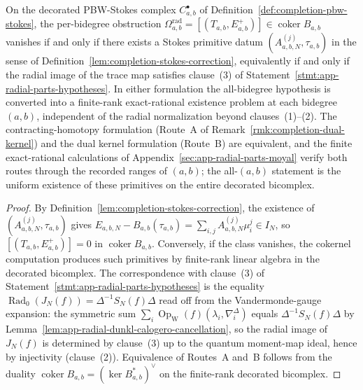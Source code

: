 \begin{thm}
\label{thm:completion-omega-rad-vanishes}
On the decorated PBW-Stokes complex
\(C^\bullet_{a,b}\) of Definition~\ref{def:completion-pbw-stokes},
the per-bidegree obstruction
\(\Omega^{\mathrm{rad}}_{a,b}=[(T_{a,b},E^+_{a,b})]\in
\operatorname{coker}B_{a,b}\) vanishes if and only if there exists a
Stokes primitive datum
\((A^{(j)}_{a,b,N},\tau_{a,b})\) in the sense of
Definition~\ref{lem:completion-stokes-correction}, equivalently if and
only if the radial image of the trace map satisfies
clause~(3) of Statement~\ref{stmt:app-radial-parts-hypotheses}.  In
either formulation the all-bidegree hypothesis is converted into a
finite-rank exact-rational existence problem at each bidegree
\((a,b)\), independent of the radial normalization beyond
clauses~(1)--(2).  The contracting-homotopy formulation
(Route~A of Remark~\ref{rmk:completion-dual-kernel}) and the dual
kernel formulation (Route~B) are equivalent, and the finite
exact-rational calculations of Appendix~\ref{sec:app-radial-parts-moyal}
verify both routes through the recorded ranges of \((a,b)\); the
all-\((a,b)\) statement is the uniform existence of these
primitives on the entire decorated bicomplex.
\end{thm}

\begin{proof}
By Definition~\ref{lem:completion-stokes-correction}, the existence of
\((A^{(j)}_{a,b,N},\tau_{a,b})\) gives
\(E_{a,b,N}-B_{a,b}(\tau_{a,b})=\sum_{i,j}A^{(j)}_{a,b,N}\mu^j_i\in
I_N\), so \([(T_{a,b},E^+_{a,b})]=0\) in
\(\operatorname{coker}B_{a,b}\).  Conversely, if the class
vanishes, the cokernel computation produces such primitives by
finite-rank linear algebra in the decorated bicomplex.  The
correspondence with clause~(3) of
Statement~\ref{stmt:app-radial-parts-hypotheses} is the equality
\(\operatorname{Rad}_0(J_N(f))=\Delta^{-1}S_N(f)\Delta\) read off
from the Vandermonde-gauge expansion: the symmetric sum
\(\sum_i\operatorname{Op}_{\mathrm W}(f)(\lambda_i,\nabla^\Delta_i)\)
equals \(\Delta^{-1}S_N(f)\Delta\) by
Lemma~\ref{lem:app-radial-dunkl-calogero-cancellation}, so the
radial image of \(J_N(f)\) is determined by clause~(3) up to the
quantum moment-map ideal, hence by injectivity (clause~(2)).
Equivalence of Routes~A and~B follows from the duality
\(\operatorname{coker}B_{a,b}=(\ker B^*_{a,b})^\vee\) on the
finite-rank decorated bicomplex.
\end{proof}

